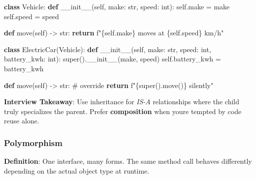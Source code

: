 \documentclass[11pt]{article}
\newenvironment{Shaded}{\begin{snugshade}}{\end{snugshade}}
\newcommand{\BuiltInTok}[1]{\textcolor[rgb]{0.50,0.55,0.55}{#1}}
\newcommand{\CommentTok}[1]{\textcolor[rgb]{0.48,0.49,0.49}{#1}}
\newcommand{\ControlFlowTok}[1]{\textcolor[rgb]{0.99,0.74,0.29}{\textbf{#1}}}
\newcommand{\FunctionTok}[1]{\textcolor[rgb]{0.56,0.27,0.68}{#1}}
\newcommand{\KeywordTok}[1]{\textcolor[rgb]{0.81,0.81,0.76}{\textbf{#1}}}
\newcommand{\NormalTok}[1]{\textcolor[rgb]{0.81,0.81,0.76}{#1}}
\newcommand{\OperatorTok}[1]{\textcolor[rgb]{0.81,0.81,0.76}{#1}}
\newcommand{\SpecialCharTok}[1]{\textcolor[rgb]{0.24,0.68,0.91}{#1}}
\newcommand{\SpecialStringTok}[1]{\textcolor[rgb]{0.85,0.27,0.33}{#1}}
\newcommand{\VariableTok}[1]{\textcolor[rgb]{0.15,0.68,0.68}{#1}}
\begin{document}
\begin{Shaded}
\begin{Highlighting}[]
\KeywordTok{class}\NormalTok{ Vehicle:}
    \KeywordTok{def} \FunctionTok{\_\_init\_\_}\NormalTok{(}\VariableTok{self}\NormalTok{, make: }\BuiltInTok{str}\NormalTok{, speed: }\BuiltInTok{int}\NormalTok{):}
        \VariableTok{self}\NormalTok{.make }\OperatorTok{=}\NormalTok{ make}
        \VariableTok{self}\NormalTok{.speed }\OperatorTok{=}\NormalTok{ speed}

    \KeywordTok{def}\NormalTok{ move(}\VariableTok{self}\NormalTok{) }\OperatorTok{{-}\textgreater{}} \BuiltInTok{str}\NormalTok{:}
        \ControlFlowTok{return} \SpecialStringTok{f"}\SpecialCharTok{\{}\VariableTok{self}\SpecialCharTok{.}\NormalTok{make}\SpecialCharTok{\}}\SpecialStringTok{ moves at }\SpecialCharTok{\{}\VariableTok{self}\SpecialCharTok{.}\NormalTok{speed}\SpecialCharTok{\}}\SpecialStringTok{ km/h"}

\KeywordTok{class}\NormalTok{ ElectricCar(Vehicle):}
    \KeywordTok{def} \FunctionTok{\_\_init\_\_}\NormalTok{(}\VariableTok{self}\NormalTok{, make: }\BuiltInTok{str}\NormalTok{, speed: }\BuiltInTok{int}\NormalTok{, battery\_kwh: }\BuiltInTok{int}\NormalTok{):}
        \BuiltInTok{super}\NormalTok{().}\FunctionTok{\_\_init\_\_}\NormalTok{(make, speed)}
        \VariableTok{self}\NormalTok{.battery\_kwh }\OperatorTok{=}\NormalTok{ battery\_kwh}

    \KeywordTok{def}\NormalTok{ move(}\VariableTok{self}\NormalTok{) }\OperatorTok{{-}\textgreater{}} \BuiltInTok{str}\NormalTok{:           }\CommentTok{\# override}
        \ControlFlowTok{return} \SpecialStringTok{f"}\SpecialCharTok{\{}\BuiltInTok{super}\NormalTok{()}\SpecialCharTok{.}\NormalTok{move()}\SpecialCharTok{\}}\SpecialStringTok{ silently"}
\end{Highlighting}
\end{Shaded}

\textbf{Interview Takeaway}: Use inheritance for \emph{IS-A} relationships where the child truly specializes the parent. Prefer \textbf{composition} when you\textquotesingle re tempted by code reuse alone.

\subsubsection{Polymorphism}\label{polymorphism}

\textbf{Definition}: One interface, many forms. The same method call behaves differently depending on the actual object type at runtime.
\end{document}
